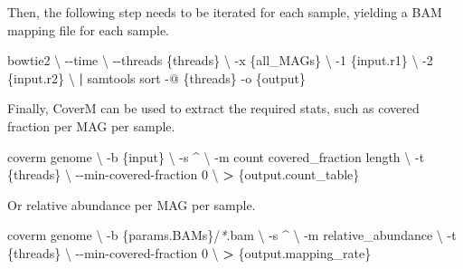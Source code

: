 \documentclass[
]{book}
\newenvironment{Shaded}{\begin{snugshade}}{\end{snugshade}}
\newcommand{\AttributeTok}[1]{\textcolor[rgb]{0.77,0.63,0.00}{#1}}
\newcommand{\DataTypeTok}[1]{\textcolor[rgb]{0.13,0.29,0.53}{#1}}
\newcommand{\ExtensionTok}[1]{#1}
\newcommand{\KeywordTok}[1]{\textcolor[rgb]{0.13,0.29,0.53}{\textbf{#1}}}
\newcommand{\NormalTok}[1]{#1}
\newcommand{\OperatorTok}[1]{\textcolor[rgb]{0.81,0.36,0.00}{\textbf{#1}}}
\newcommand{\PreprocessorTok}[1]{\textcolor[rgb]{0.56,0.35,0.01}{\textit{#1}}}
\begin{document}
Then, the following step needs to be iterated for each sample, yielding a BAM mapping file for each sample.
\small

\begin{Shaded}
\begin{Highlighting}[]
\ExtensionTok{bowtie2} \DataTypeTok{\textbackslash{}}
      \AttributeTok{{-}{-}time} \DataTypeTok{\textbackslash{}}
      \AttributeTok{{-}{-}threads}\NormalTok{ \{threads\} }\DataTypeTok{\textbackslash{}}
      \AttributeTok{{-}x}\NormalTok{ \{all\_MAGs\} }\DataTypeTok{\textbackslash{}}
      \AttributeTok{{-}1}\NormalTok{ \{input.r1\} }\DataTypeTok{\textbackslash{}}
      \AttributeTok{{-}2}\NormalTok{ \{input.r2\} }\DataTypeTok{\textbackslash{}}
      \KeywordTok{|} \ExtensionTok{samtools}\NormalTok{ sort }\AttributeTok{{-}@}\NormalTok{ \{threads\} }\AttributeTok{{-}o}\NormalTok{ \{output\}}
\end{Highlighting}
\end{Shaded}

\normalsize

Finally, CoverM can be used to extract the required stats, such as covered fraction per MAG per sample.
\small

\begin{Shaded}
\begin{Highlighting}[]
\ExtensionTok{coverm}\NormalTok{ genome }\DataTypeTok{\textbackslash{}}
      \AttributeTok{{-}b}\NormalTok{ \{input\} }\DataTypeTok{\textbackslash{}}
      \AttributeTok{{-}s}\NormalTok{ \^{} }\DataTypeTok{\textbackslash{}}
      \AttributeTok{{-}m}\NormalTok{ count covered\_fraction length }\DataTypeTok{\textbackslash{}}
      \AttributeTok{{-}t}\NormalTok{ \{threads\} }\DataTypeTok{\textbackslash{}}
      \AttributeTok{{-}{-}min{-}covered{-}fraction}\NormalTok{ 0 }\DataTypeTok{\textbackslash{}}
      \OperatorTok{\textgreater{}}\NormalTok{ \{output.count\_table\}}
\end{Highlighting}
\end{Shaded}

\normalsize

Or relative abundance per MAG per sample.
\small

\begin{Shaded}
\begin{Highlighting}[]
\ExtensionTok{coverm}\NormalTok{ genome }\DataTypeTok{\textbackslash{}}
      \AttributeTok{{-}b}\NormalTok{ \{params.BAMs\}/}\PreprocessorTok{*}\NormalTok{.bam }\DataTypeTok{\textbackslash{}}
      \AttributeTok{{-}s}\NormalTok{ \^{} }\DataTypeTok{\textbackslash{}}
      \AttributeTok{{-}m}\NormalTok{ relative\_abundance }\DataTypeTok{\textbackslash{}}
      \AttributeTok{{-}t}\NormalTok{ \{threads\} }\DataTypeTok{\textbackslash{}}
      \AttributeTok{{-}{-}min{-}covered{-}fraction}\NormalTok{ 0 }\DataTypeTok{\textbackslash{}}
      \OperatorTok{\textgreater{}}\NormalTok{ \{output.mapping\_rate\}}
\end{Highlighting}
\end{Shaded}
\end{document}
